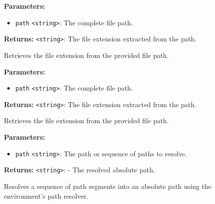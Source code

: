 \documentclass[12pt,a4paper]{article}
\begin{document}
\vspace{5mm}
\noindent {}


\noindent \textbf{Parameters:}
\begin{itemize}
  \item \texttt{path} \texttt{<string>}: The complete file path.
\end{itemize}

\noindent \textbf{Returns:} \texttt{<string>}: The file extension extracted from the path.

\noindent Retrieves the file extension from the provided file path.

\vspace{5mm}
\noindent {}


\noindent \textbf{Parameters:}
\begin{itemize}
  \item \texttt{path} \texttt{<string>}: The complete file path.
\end{itemize}

\noindent \textbf{Returns:} \texttt{<string>}: The file extension extracted from the path.

\noindent Retrieves the file extension from the provided file path.

\vspace{5mm}
\noindent {}


\noindent \textbf{Parameters:}
\begin{itemize}
  \item \texttt{path} \texttt{<string>}: The path or sequence of paths to resolve.
\end{itemize}

\noindent \textbf{Returns:} \texttt{<string>}: - The resolved absolute path.

\noindent Resolves a sequence of path segments into an absolute path using the environment's path resolver.

\vspace{5mm}
\noindent {}
\end{document}
